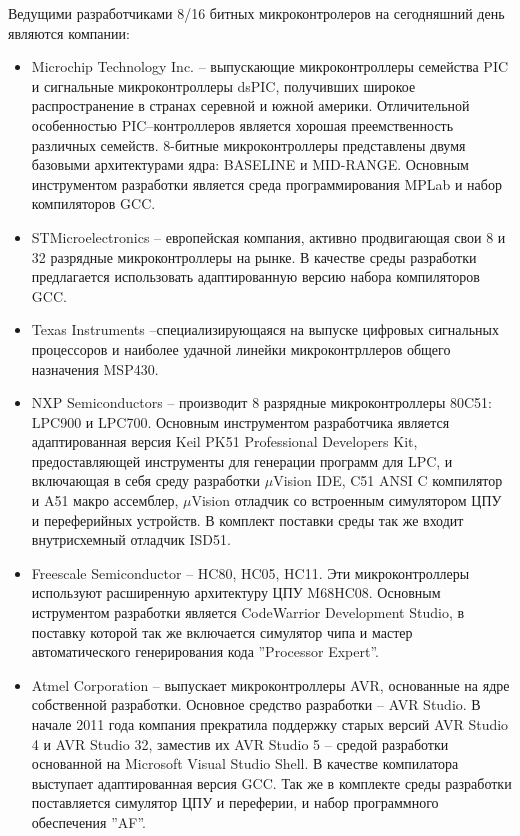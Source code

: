 Ведущими разработчиками 8/16 битных микроконтролеров на сегодняшний день
являются компании:
\begin{itemize}	
	\item{} Microchip Technology Inc. -- выпускающие микроконтроллеры семейства PIC и
		сигнальные микроконтроллеры dsPIC,
		получивших широкое распространение в странах серевной и южной америки.
		Отличительной особенностью PIC--контроллеров является хорошая преемственность
		различных семейств.
		8-битные микроконтроллеры представлены двумя базовыми архитектурами ядра:
		BASELINE и MID-RANGE. Основным инструментом разработки является среда программирования
		MPLab и набор компиляторов GCC.
	\item{} STMicroelectronics -- европейская компания, активно продвигающая свои 8 и 32
		разрядные микроконтроллеры на рынке. В качестве среды разработки предлагается
		использовать адаптированную версию набора компиляторов GCC.
	\item{} Texas Instruments --специализирующаяся на выпуске цифровых сигнальных процессоров
		и наиболее удачной линейки микроконтрллеров общего назначения MSP430.
	\item{} NXP Semiconductors -- производит 8 разрядные микроконтроллеры
			80C51: LPC900 и LPC700.
			Основным инструментом разработчика является адаптированная версия
			Keil PK51 Professional Developers Kit, предоставляющей инструменты для
			генерации программ для LPC, и включающая в себя среду разработки
			$\mu{}$Vision IDE, C51 ANSI C компилятор и A51 макро ассемблер, $\mu{}$Vision отладчик
			со встроенным симулятором ЦПУ и переферийных устройств. В комплект поставки
			среды так же входит внутрисхемный отладчик ISD51.			
	\item{} Freescale Semiconductor -- HC80, HC05, HC11.
	Эти микроконтроллеры используют расширенную архитектуру ЦПУ M68HC08.
	Основным иструментом разработки является CodeWarrior Development Studio, в поставку
	которой так же включается симулятор чипа и мастер автоматического генерирования
	кода ''Processor Expert''.
	\item{} Atmel Corporation -- выпускает микроконтроллеры AVR, основанные на ядре
	собственной разработки. Основное средство разработки -- AVR Studio. В начале 2011
	года компания прекратила поддержку старых версий AVR Studio 4 и AVR Studio 32,
	заместив их AVR Studio 5 -- средой разработки основанной на Microsoft Visual
	Studio Shell. В качестве компилатора выступает адаптированная версия GCC. Так
	же в комплекте среды разработки поставляется симулятор ЦПУ и переферии, и
	набор программного обеспечения ''AF''.
\end{itemize}

